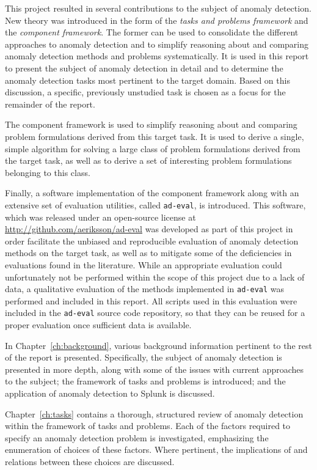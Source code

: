 This project resulted in several contributions to the subject of anomaly detection. New theory was introduced in the form of the \emph{tasks and problems framework} and the \emph{component framework}. The former can be used to consolidate the different approaches to anomaly detection and to simplify reasoning about and comparing anomaly detection methods and problems systematically. It is used in this report to present the subject of anomaly detection in detail and to determine the anomaly detection tasks most pertinent to the target domain. Based on this discussion, a specific, previously unstudied task is chosen as a focus for the remainder of the report.

The component framework is used to simplify reasoning about and comparing problem formulations derived from this target task. It is used to derive a single, simple algorithm for solving a large class of problem formulations derived from the target task, as well as to derive a set of interesting problem formulations belonging to this class.

Finally, a software implementation of the component framework along with an extensive set of evaluation utilities, called \texttt{ad-eval}, is introduced. This software, which was released under an open-source license at \url{http://github.com/aeriksson/ad-eval} was developed as part of this project in order facilitate the unbiased and reproducible evaluation of anomaly detection methods on the target task, as well as to mitigate some of the deficiencies in evaluations found in the literature. While an appropriate evaluation could unfortunately not be performed within the scope of this project due to a lack of data, a qualitative evaluation of the methods implemented in \texttt{ad-eval} was performed and included in this report. All scripts used in this evaluation were included in the \texttt{ad-eval} source code repository, so that they can be reused for a proper evaluation once sufficient data is available.

In Chapter~\ref{ch:background}, various background information pertinent to the rest of the report is presented. Specifically, the subject of anomaly detection is presented in more depth, along with some of the issues with current approaches to the subject; the framework of tasks and problems is introduced; and the application of anomaly detection to Splunk is discussed. 

Chapter~\ref{ch:tasks} contains a thorough, structured review of anomaly detection within the framework of tasks and problems. Each of the factors required to specify an anomaly detection problem is investigated, emphasizing the enumeration of choices of these factors. Where pertinent, the implications of and relations between these choices are discussed.

